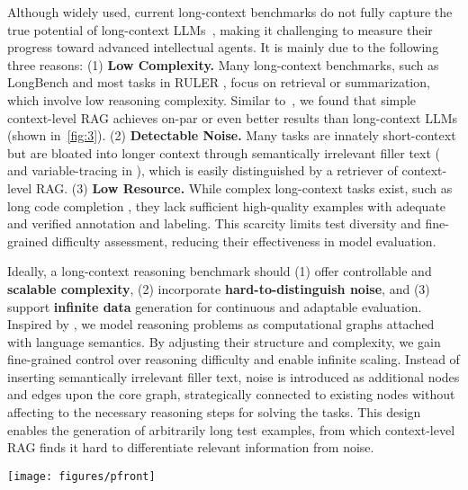 Although widely used, current long-context benchmarks do not fully capture the true potential of long-context LLMs~\citep{yu2024defense,li2024long,li2024retrieval}, making it challenging to measure their progress toward advanced intellectual agents. 
It is mainly due to the following three reasons: (1) \textbf{Low Complexity.} Many long-context benchmarks, such as LongBench \citep{bai2025longbenchv2deeperunderstanding, bai2024longbenchbilingualmultitaskbenchmark} and most tasks in RULER \citep{hsieh2024rulerwhatsrealcontext}, focus on retrieval or summarization, which involve low reasoning complexity. 
Similar to~\citep{yu2024defenserageralongcontext}, we found that simple context-level RAG achieves on-par or even better results than long-context LLMs (shown in~\cref{fig:3}). 
(2) \textbf{Detectable Noise.} Many tasks are innately short-context but are bloated into longer context through semantically irrelevant filler text (\citet{kuratov2024babilongtestinglimitsllms} and variable-tracing in \citet{hsieh2024rulerwhatsrealcontext}), which is easily distinguished by a retriever of context-level RAG. 
(3) \textbf{Low Resource.} While complex long-context tasks exist, such as long code completion \citep{loughridge2024dafnybenchbenchmarkformalsoftware}, they lack sufficient high-quality examples with adequate and verified annotation and labeling. This scarcity limits test diversity and fine-grained difficulty assessment, reducing their effectiveness in model evaluation. 

Ideally, a long-context reasoning benchmark should (1) offer controllable and \textbf{scalable complexity}, (2) incorporate \textbf{hard-to-distinguish noise}, and (3) support \textbf{infinite data} generation for continuous and adaptable evaluation. Inspired by \citet{delétang2023neuralnetworkschomskyhierarchy, ye2024physicslanguagemodels21}, we model reasoning problems as computational graphs attached with language semantics. By adjusting their structure and complexity, we gain fine-grained control over reasoning difficulty and enable infinite scaling. Instead of inserting semantically irrelevant filler text, noise is introduced as additional nodes and edges upon the core graph, strategically connected to existing nodes without affecting to the necessary reasoning steps for solving the tasks. This design enables the generation of arbitrarily long test examples, from which context-level RAG finds it hard to differentiate relevant information from noise. 

\begin{figure*}
    \texttt{[image: figures/pfront]} 
    \caption{Study of Llama3.1-70B-Instruct with Passive RAG (referred to as OnePassRAG) and Active RAG (referred to as InteractiveRAG) on popular long-context benchmarks: RULER (at 64K context length), LongBench ($>$8K), LongBenchV2, and LOFT (128K context length). RAG is under the 2048 retrieved token budget, and the decoder used for the RAG is Llama-3.1-70B-Instruct. RAGs generally have robust performance, on par with the corresponding LLMs, showing that previous long-context benchmarks are either too simple in reasoning complexity or contain detectable noise.} 
    \label{passiveplusinteractive} 
    \label{fig:3}
\end{figure*} 

